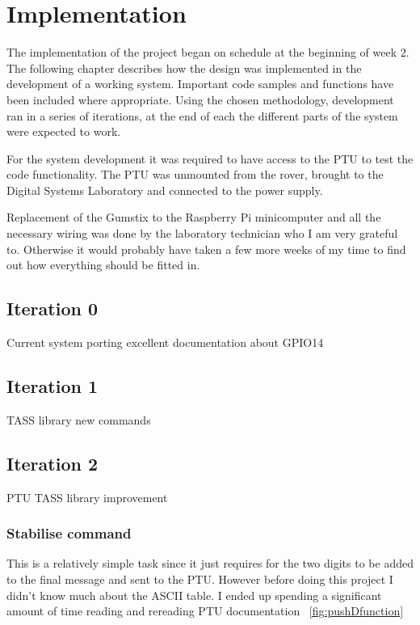 \chapter{Implementation}
The implementation of the project began on schedule at the beginning of week 2. The following chapter describes how the design was implemented in the development of a working system. Important code samples and functions have been included where appropriate. Using the chosen methodology, development ran in a series of iterations, at the end of each the different parts of the system were expected to work.

For the system development it was required to have access to the PTU to test the code functionality. The PTU was unmounted from the rover, brought to the Digital Systems Laboratory and connected to the power supply.

Replacement of the Gumstix to the Raspberry Pi minicomputer and all the necessary wiring was done by the laboratory technician who I am very grateful to. Otherwise it would probably have taken a few more weeks of my time to find out how everything should be fitted in. 

\section{Iteration 0}
Current system porting
excellent documentation about GPIO14

\section{Iteration 1}
TASS library new commands
 
\section{Iteration 2}
PTU TASS library improvement
\subsection{Stabilise command}
\label{stabilize_implementation}
 This is a relatively simple task since it just requires for the two digits to be added to the final message and sent to the PTU. However before doing this project I didn't know much about the ASCII table. I ended up spending a significant amount of time reading and rereading PTU documentation ~\ref{fig:pushDfunction}
 
